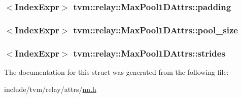 \subsubsection[{\texorpdfstring{padding}{padding}}]{$<${\bf Index\+Expr}$>$ tvm\+::relay\+::\+Max\+Pool1\+D\+Attrs\+::padding}\hypertarget{structtvm_1_1relay_1_1MaxPool1DAttrs_a3044a18d45840ede7ab245ebdcc19bac}{}\label{structtvm_1_1relay_1_1MaxPool1DAttrs_a3044a18d45840ede7ab245ebdcc19bac}
\subsubsection[{\texorpdfstring{pool\+\_\+size}{pool_size}}]{$<${\bf Index\+Expr}$>$ tvm\+::relay\+::\+Max\+Pool1\+D\+Attrs\+::pool\+\_\+size}\hypertarget{structtvm_1_1relay_1_1MaxPool1DAttrs_af4792b9065cf98ef5335c34e581c05cd}{}\label{structtvm_1_1relay_1_1MaxPool1DAttrs_af4792b9065cf98ef5335c34e581c05cd}
\subsubsection[{\texorpdfstring{strides}{strides}}]{$<${\bf Index\+Expr}$>$ tvm\+::relay\+::\+Max\+Pool1\+D\+Attrs\+::strides}\hypertarget{structtvm_1_1relay_1_1MaxPool1DAttrs_a174ab0e449f26b9f7ad10355160e6284}{}\label{structtvm_1_1relay_1_1MaxPool1DAttrs_a174ab0e449f26b9f7ad10355160e6284}


The documentation for this struct was generated from the following file\+:\begin{DoxyCompactItemize}
\item 
include/tvm/relay/attrs/\hyperlink{include_2tvm_2relay_2attrs_2nn_8h}{nn.\+h}\end{DoxyCompactItemize}
